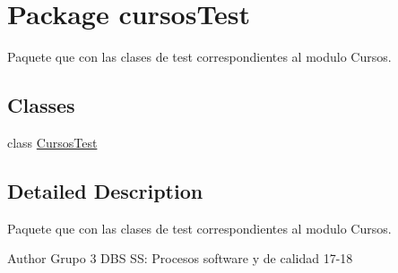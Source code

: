 \hypertarget{namespacecursos_test}{}\section{Package cursos\+Test}
\label{namespacecursos_test}


Paquete que con las clases de test correspondientes al modulo Cursos.  


\subsection*{Classes}
\begin{DoxyCompactItemize}
\item 
class \hyperlink{classcursos_test_1_1_cursos_test}{Cursos\+Test}
\end{DoxyCompactItemize}


\subsection{Detailed Description}
Paquete que con las clases de test correspondientes al modulo Cursos. 

\begin{DoxyAuthor}{Author}
Grupo 3 D\+BS SS\+: Procesos software y de calidad 17-\/18 
\end{DoxyAuthor}
